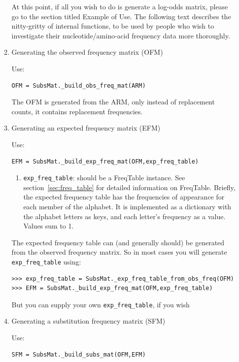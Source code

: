 \documentclass{report}
\begin{document}
\begin{enumerate}
\begin{enumerate}
At this point, if all you wish to do is generate a log-odds matrix, please go to the section titled Example of Use. The following text describes the nitty-gritty of internal functions, to be used by people who wish to investigate their nucleotide/amino-acid frequency data more thoroughly.

\item Generating the observed frequency matrix (OFM)

Use:
\begin{verbatim}
OFM = SubsMat._build_obs_freq_mat(ARM)
\end{verbatim}

  The OFM is generated from the ARM, only instead of replacement counts, it contains replacement frequencies.

\item Generating an expected frequency matrix (EFM)

Use:

\begin{verbatim}
EFM = SubsMat._build_exp_freq_mat(OFM,exp_freq_table)
\end{verbatim}

  \begin{enumerate}
    \item \verb|exp_freq_table|: should be a FreqTable instance. See section~\ref{sec:freq_table} for detailed information on FreqTable. Briefly, the expected frequency table has the frequencies of appearance for each member of the alphabet. It is
  implemented as a dictionary with the alphabet letters as keys, and each letter's frequency as a value. Values sum to 1.
  \end{enumerate}

The expected frequency table can (and generally should) be generated from the observed frequency matrix. So in most cases you will generate \verb|exp_freq_table| using:

\begin{verbatim}
>>> exp_freq_table = SubsMat._exp_freq_table_from_obs_freq(OFM)
>>> EFM = SubsMat._build_exp_freq_mat(OFM,exp_freq_table)
\end{verbatim}

But you can supply your own \verb|exp_freq_table|, if you wish

\item Generating a substitution frequency matrix (SFM)

Use:

\begin{verbatim}
SFM = SubsMat._build_subs_mat(OFM,EFM)
\end{verbatim}


\end{enumerate}
\end{enumerate}
\end{document}

